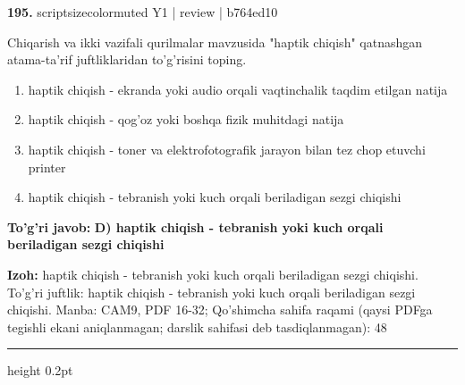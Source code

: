 \documentclass[10pt,a4paper]{article}
\begin{document}
{\bfseries\sffamily\color{ink} 195.} {scriptsizecolor{muted} Y1 | review | b764ed10}
\par
Chiqarish va ikki vazifali qurilmalar mavzusida "haptik chiqish" qatnashgan atama-ta'rif juftliklaridan to'g'risini toping.
\begin{enumerate}[label=\Alph*),leftmargin=9mm]
\item haptik chiqish - ekranda yoki audio orqali vaqtinchalik taqdim etilgan natija
\item haptik chiqish - qog'oz yoki boshqa fizik muhitdagi natija
\item haptik chiqish - toner va elektrofotografik jarayon bilan tez chop etuvchi printer
\item haptik chiqish - tebranish yoki kuch orqali beriladigan sezgi chiqishi
\end{enumerate}
\begin{tcolorbox}[enhanced,breakable,colback=teal!4,colframe=teal!60!black,boxrule=0.45pt,arc=1.2mm,left=2.7mm,right=2.7mm,top=1.8mm,bottom=1.8mm,before skip=2mm,after skip=2mm]
{\bfseries\sffamily\color{teal}To'g'ri javob:} \textbf{D) haptik chiqish - tebranish yoki kuch orqali beriladigan sezgi chiqishi}
\par\smallskip
{\bfseries Izoh:} haptik chiqish - tebranish yoki kuch orqali beriladigan sezgi chiqishi. To'g'ri juftlik: haptik chiqish - tebranish yoki kuch orqali beriladigan sezgi chiqishi. Manba: CAM9, PDF 16-32; Qo'shimcha sahifa raqami (qaysi PDFga tegishli ekani aniqlanmagan; darslik sahifasi deb tasdiqlanmagan): 48
\end{tcolorbox}
\vspace{2mm}\hrule height 0.2pt\vspace{3mm}
\end{document}
